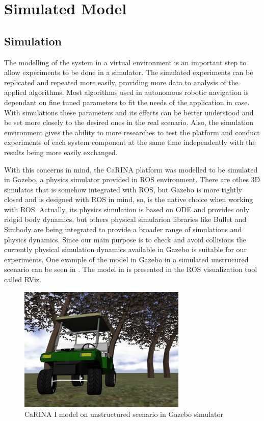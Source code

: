 \section{Simulated Model}


\subsection{Simulation}

The modelling of the system in a virtual environment is an important step to
allow experiments to be done in a simulator. The simulated experiments can be
replicated and repeated more easily, providing more data to analysis of the
applied algorithms. Most algorithms used in autonomous robotic navigation is
dependant on fine tuned parameters to fit the needs of the application in case.
With simulations these parameters and its effects can be better understood and
be set more closely to the desired ones in the real scenario. Also, the
simulation environment gives the ability to more researches to test the platform
and conduct experiments of each system component at the same time independently
with the results being more easily exchanged.

With this concerns in mind, the CaRINA platform was modelled to be simulated in
Gazebo, a physics simulator provided in ROS environment. There are othes 3D
simulatos that is somehow integrated with ROS, but Gazebo is more tightly closed
and is designed with ROS in mind, so, is the native choice when working with
ROS. Actually, its physics simulation is based on ODE and provides only ridgid
body dynamics, but others physical simularion libraries like Bullet and Simbody
are being integrated to provide a broader range of simulations and physics
dynamics. Since our main purpose is to check and avoid collisions the currently
physical simulation dynamics available in Gazebo is suitable for our
experiments. One example of the model in Gazebo in a simulated unstrucured
scenario can be seen in . The model in  is
presented in the ROS visualization tool called RViz.


\begin{figure}[h!]
	\begin{minipage}[b]{1\linewidth}
	    \centering
	    \includegraphics[width=8cm]{modelo_carina/carina_gazebo_frente_fundo.png}
	 	\caption{CaRINA I model on unstructured scenario in Gazebo simulator}
	 	\label{fig:gazebo}
	\end{minipage}
\end{figure}



